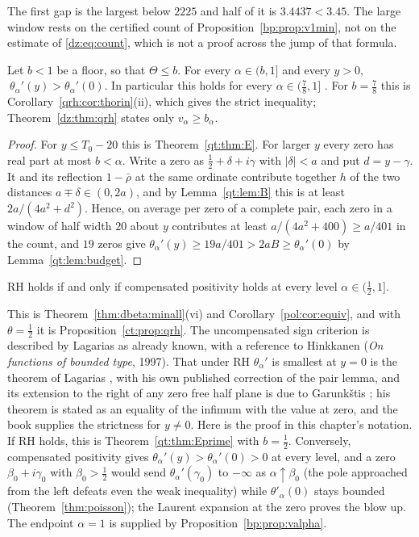 The first gap is the largest below $2225$ and half of it is $3.4437<3.45$. The large window rests on the certified count of Proposition~\ref{bp:prop:v1min}, not on the estimate of \eqref{dz:eq:count}, which is not a proof across the jump of that formula.

\begin{theorem}\label{qt:thm:Eprime}
Let $b<1$ be a floor, so that $\Theta\le b$. For every $\alpha\in(b,1]$ and every $y>0$, $\ \theta_\alpha'(y)>\theta_\alpha'(0)$. In particular this holds for every $\alpha\in(\tfrac78,1]$ \cite{OAI26a}. For $b=\tfrac78$ this is Corollary~\ref{qrh:cor:thorin}(ii), which gives the strict inequality; Theorem~\ref{dz:thm:qrh} states only $v_\alpha\ge b_\alpha$.
\end{theorem}

\begin{proof}
For $y\le T_0-20$ this is Theorem~\ref{qt:thm:E}. For larger $y$ every zero has real part at most $b<\alpha$. Write a zero as $\tfrac12+\delta+i\gamma$ with $|\delta|<a$ and put $d=y-\gamma$. It and its reflection $1-\bar\rho$ at the same ordinate contribute together $h$ of the two distances $a\mp\delta\in(0,2a)$, and by Lemma~\ref{qt:lem:B} this is at least $2a/(4a^2+d^2)$. Hence, on average per zero of a complete pair, each zero in a window of half width $20$ about $y$ contributes at least $a/(4a^2+400)\ge a/401$ in the count, and $19$ zeros give $\theta_\alpha'(y)\ge19a/401>2aB\ge\theta_\alpha'(0)$ by Lemma~\ref{qt:lem:budget}.
\end{proof}


\begin{theorem}\label{qt:thm:F}
RH holds if and only if compensated positivity holds at every level $\alpha\in(\tfrac12,1]$.
\end{theorem}

This is Theorem~\ref{thm:dbeta:minall}(vi) and Corollary~\ref{pol:cor:equiv}, and with $\theta=\tfrac12$ it is Proposition~\ref{ct:prop:qrh}. The uncompensated sign criterion is described by Lagarias \cite{Lagarias} as already known, with a reference to Hinkkanen (\emph{On functions of bounded type}, 1997). That under RH $\theta_\alpha'$ is smallest at $y=0$ is the theorem of Lagarias \cite{Lagarias}, with his own published correction of the pair lemma, and its extension to the right of any zero free half plane is due to Garunk\v{s}tis \cite{Garunkstis02}; his theorem is stated as an equality of the infimum with the value at zero, and the book supplies the strictness for $y\ne0$. Here is the proof in this chapter's notation. If RH holds, this is Theorem~\ref{qt:thm:Eprime} with $b=\tfrac12$. Conversely, compensated positivity gives $\theta_\alpha'(y)>\theta_\alpha'(0)>0$ at every level, and a zero $\beta_0+i\gamma_0$ with $\beta_0>\tfrac12$ would send $\theta_\alpha'(\gamma_0)$ to $-\infty$ as $\alpha\uparrow\beta_0$ (the pole approached from the left defeats even the weak inequality) while $\theta'_\alpha(0)$ stays bounded (Theorem~\ref{thm:poisson}); the Laurent expansion at the zero proves the blow up. The endpoint $\alpha=1$ is supplied by Proposition~\ref{bp:prop:valpha}.

